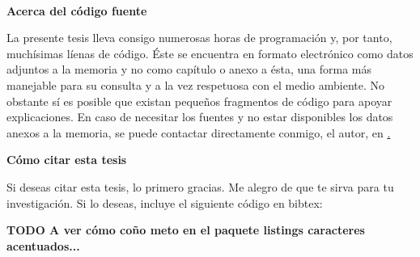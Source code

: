 \cleardoublepage
\begin{fullwidth}
~\vfill
\thispagestyle{empty}
\setlength{\parindent}{0pt}
\setlength{\parskip}{\baselineskip}
\par{
	\textbf{Acerca del código fuente}
	
	La presente tesis lleva consigo numerosas horas de programación y, por tanto, muchísimas líenas de código. Éste se encuentra en formato electrónico como datos adjuntos a la memoria y no como capítulo o anexo a ésta, una forma más manejable para su consulta y a la vez respetuosa con el medio ambiente. No obstante sí es posible que existan pequeños fragmentos de código para apoyar explicaciones. En caso de necesitar los fuentes y no estar disponibles los datos anexos a la memoria, se puede contactar directamente conmigo, el autor, en \href{mailto:alberto.diaz@upm.es}.
	}

\par{
	\textbf{Cómo citar esta tesis}
	
	Si deseas citar esta tesis, lo primero gracias. Me alegro de que te sirva para tu investigación. Si lo deseas, incluye el siguiente código en bibtex:
	
	\textbf{TODO A ver cómo coño meto en el paquete listings caracteres acentuados...}
	}


\end{fullwidth}


